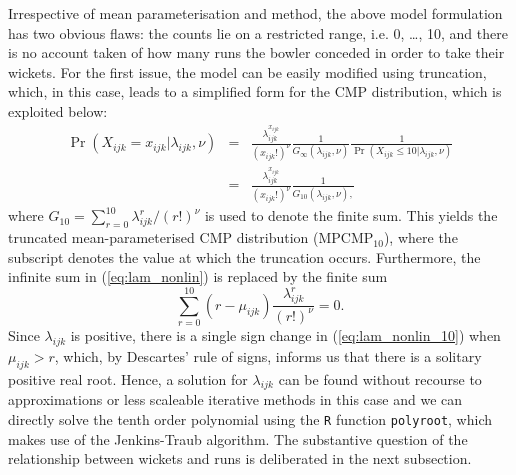 \documentclass{statsoc}
\begin{document}
Irrespective of mean parameterisation and method, the above model formulation has two obvious flaws: the counts lie on a restricted range, i.e. {0, \ldots, 10}, and there is no account taken of how many runs the bowler conceded in order to take their wickets.
For the first issue,  the model can be easily modified using truncation, which, in this case, leads to a simplified form for the CMP distribution, which is exploited below:
\begin{eqnarray*}
\Pr(X_{ijk} = x_{ijk} |\lambda_{ijk}, \nu) &=& \frac{\lambda_{ijk}^{x_{ijk}}}{(x_{ijk}!)^{\nu}} \frac{1}{G_{\infty}(\lambda_{ijk}, \nu)} \frac{1}{\Pr(X_{ijk} \leq 10 |\lambda_{ijk}, \nu)} \\
&=& \frac{\lambda_{ijk}^{x_{ijk}}}{(x_{ijk}!)^{\nu}} \frac{1}{G_{10}(\lambda_{ijk}, \nu),} 
\end{eqnarray*}
where $G_{10} = \sum_{r=0}^{10} \lambda_{ijk}^r/(r!)^{\nu}$
 is used to denote the finite sum. This yields the truncated mean-parameterised CMP distribution (MPCMP$_{10}$), where the subscript denotes the value at which the truncation occurs. Furthermore, the infinite sum in (\ref{eq:lam_nonlin}) is replaced by the finite sum
\begin{equation}\label{eq:lam_nonlin_10}
\sum_{r=0}^{10} (r - \mu_{ijk})  \frac{\lambda_{ijk}^r}{(r!)^{\nu}}= 0.
\end{equation}
Since $\lambda_{ijk}$ is positive, there is a single sign change in (\ref{eq:lam_nonlin_10}) when $\mu_{ijk} > r$, which, by Descartes' rule of signs, informs us that there is a solitary positive real root. Hence, a solution for $\lambda_{ijk}$ can be found without recourse to approximations or less scaleable iterative methods in this case and we can directly solve the tenth order polynomial using the \verb|R| function \verb|polyroot|, which makes use of the Jenkins-Traub algorithm. The substantive question of the relationship between wickets and runs is deliberated in the next subsection.


\end{document}
